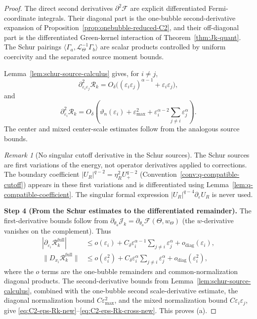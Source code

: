 \documentclass[11pt,reqno,a4paper]{amsart}
\numberwithin{equation}{section}
\theoremstyle{plain}
\theoremstyle{remark}
\newtheorem{remark}[theorem]{Remark}
\theoremstyle{plain}
\begin{document}
\begin{proof}
The direct second derivatives $\partial^2\mathscr F$ are explicit
differentiated Fermi-coordinate integrals.  Their diagonal part is the
one-bubble second-derivative expansion of
Proposition~\ref{prop:onebubble-reduced-C2}, and their off-diagonal part
is the differentiated Green-kernel interaction of
Theorem~\ref{thm:Jk-quant}.  The Schur pairings
$\langle\Gamma_a,\mathcal L_\Theta^{-1}\Gamma_b\rangle$ are scalar products
controlled by uniform coercivity and the separated source moment bounds.

Lemma~\ref{lem:schur-source-calculus} gives, for $i\ne j$,
\[
\partial_{\varepsilon_i\varepsilon_j}^2\mathcal R_k
=O_\delta\bigl((\varepsilon_i\varepsilon_j)^{\alpha-1}+\varepsilon_i\varepsilon_j\bigr),
\]
and
\[
\partial_{\varepsilon_i}^2\mathcal R_k
=O_\delta\left(\vartheta_n(\varepsilon_i)+\varepsilon_{\max}^2
+\varepsilon_i^{\alpha-2}\sum_{j\ne i}\varepsilon_j^\alpha\right).
\]
The center and mixed center-scale estimates follow from the analogous
source bounds.

\begin{remark}[No singular cutoff derivative in the Schur sources]
\label{rem:no-singular-cutoff-derivative}
The Schur sources 
are first variations of the energy, not operator derivatives applied to
corrections.  The boundary coefficient
$|U_R|^{q-2}=\eta_R^2U_+^{q-2}$ (Convention~\ref{conv:q-compatible-cutoff})
appears in these first variations and is differentiated using
Lemma~\ref{lem:q-compatible-coefficient}.  The singular formal expression
$|U_R|^{q-4}\partial_\varepsilon U_R$ is never used.
\end{remark}

\smallskip\noindent
\textbf{Step 4 (From the Schur estimates to the differentiated remainder).}
The first-derivative bounds follow from
$\partial_{\theta_a}\mathcal J_k=\partial_{\theta_a}\mathscr F(\Theta,w_\Theta)$
(the $w$-derivative vanishes on the complement).  Thus
\begin{align}\label{eq:R-full-first-raw}
|\partial_{\varepsilon_i}\mathcal R_k^{\mathrm{full}}|
&\le o(\varepsilon_i)
+C_\delta\varepsilon_i^{\alpha-1}\sum_{j\ne i}\varepsilon_j^\alpha
+o_{\mathrm{diag}}(\varepsilon_i),\\
\label{eq:R-full-center-raw}
\|D_{x_i}\mathcal R_k^{\mathrm{full}}\|
&\le o(\varepsilon_i^2)
+C_\delta\varepsilon_i^\alpha\sum_{j\ne i}\varepsilon_j^\alpha
+o_{\mathrm{diag}}(\varepsilon_i^2),
\end{align}
where the $o$ terms are the one-bubble remainders and common-normalization
diagonal products.  The second-derivative bounds from
Lemma~\ref{lem:schur-source-calculus}, combined with the one-bubble
second scale-derivative estimate, the diagonal normalization bound
$C\varepsilon_{\max}^2$, and the mixed normalization bound
$C\varepsilon_i\varepsilon_j$, give
\eqref{eq:C2-eps-Rk-new}--\eqref{eq:C2-eps-Rk-cross-new}.  This proves
\textup{(a)}.


\end{proof}
\end{document}
